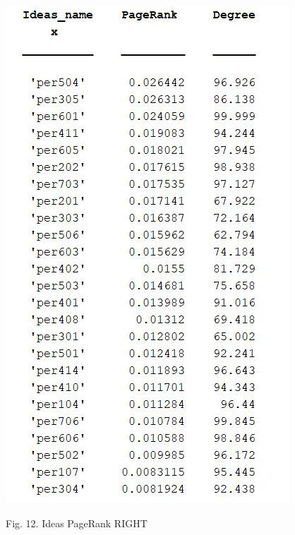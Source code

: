 \documentclass{article}%
\begin{document}
\begin{center}
\includegraphics[scale=0.5]{PageRank_ideas_right}

\begin{small}
Fig. 12. Ideas PageRank RIGHT
\end{small}
\end{center}
\end{document}
